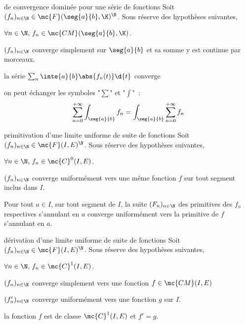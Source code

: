 \begin{adjustwidth}{-3cm}{-3cm}
\begin{theoreme}{10.63}{de convergence dominée pour une série de fonctions}
    Soit $(f_n)_{n \in \N} \in \mc{F}(\seg{a}{b},\K)^\N$. Sous réserve des hypothèses suivantes,
    \begin{enumeratebf}
        \item $\forall n \in \N,\, f_n \in \mc{CM}(\seg{a}{b},\K)$.
        \item $(f_n)_{n \in \N}$ converge simplement sur $\seg{a}{b}$ et sa somme y est continue par morceaux.
        \item la série $\sum_n \inte{a}{b}\abs{f_n(t)}\d{t}$ converge
    \end{enumeratebf}
    on peut échanger les symboles "$\sum$" et "$\int$"~:
    $$\sum_{n=0}^{+\infty} \int_{\seg{a}{b}} f_n = \int_{\seg{a}{b}} \sum_{n=0}^{+\infty} f_n $$
\end{theoreme}

\begin{theoreme}{10.66}{primitivation d'une limite uniforme de suite de fonctions}
    Soit $(f_n)_{n \in \N} \in \mc{F}(I,E)^\N$. Sous réserve des hypothèses suivantes,
    \begin{enumeratebf}
        \item $\forall n \in \N,\, f_n \in \mc{C}^0(I,E)$.
        \item $(f_n)_{n \in \N}$ converge uniformément vers une même fonction $f$ sur tout segment inclus dans $I$.
    \end{enumeratebf}
    Pour tout $a \in I$, sur tout segment de $I$, la suite $(F_n)_{n \in \N}$ des primitives des $f_n$ respectives s'annulant en $a$ converge uniformément vers la primitive de $f$ s'annulant en $a$.
\end{theoreme}

\begin{theoreme}{10.66}{dérivation d'une limite uniforme de suite de fonctions}
    Soit $(f_n)_{n \in \N} \in \mc{F}(I,E)^\N$. Sous réserve des hypothèses suivantes,
    \begin{enumeratebf}
        \item $\forall n \in \N,\, f_n \in \mc{C}^1(I,E)$.
        \item $(f_n)_{n \in \N}$ converge simplement vers une fonction $f \in \mc{CM}(I,E)$
        \item $(f'_n)_{n \in \N}$ converge uniformément vers une fonction $g$ sur $I$.
    \end{enumeratebf}
    la fonction $f$ est de classe $\mc{C}^1(I,E)$ et $f' = g$.
\end{theoreme}


\end{adjustwidth}
